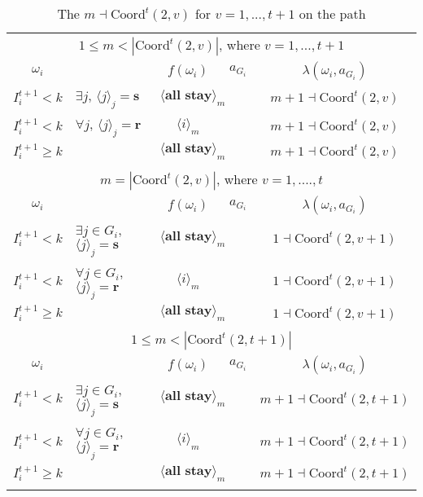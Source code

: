 \documentclass[12pt,letter]{article}
\newcommand{\Kappa}{\mathrm{Coord}}
\theoremstyle{definition}
\theoremstyle{remark}
\theoremstyle{claim}
\begin{document}
\begin{table}[!htbp]
\caption{The $m\dashv\Kappa^t(2,v)$ for $v=1,...,t+1$ on the path}
\label{table:eqm_path_kt2}
\begin{center}
\begin{tabular}{c l | c | c | c}
\multicolumn{5}{c}{$1\leq m < |\Kappa^t(2,v)|$, where $v=1,...,t+1$}\\
$\omega_i$ 	 & 	   &	$f(\omega_i)$  &	$a_{G_i}$ & $\lambda(\omega_i,a_{G_i})$ \\
\hline
\hline
$I^{t+1}_i< k$  	& 	$\exists j$, $\langle j \rangle_j=\textbf{s}$	& $\langle \textbf{all stay} \rangle_m$		&  	& $m+1\dashv \Kappa^t(2,v)$\\
$I^{t+1}_i< k$  	& 	$\forall j$, $\langle j \rangle_j=\textbf{r}$	& $\langle i \rangle_m$		&  	& $m+1\dashv \Kappa^t(2,v)$\\
$I^{t+1}_i\geq k$	 & 				& $\langle \textbf{all stay} \rangle_m$ 	& 		& $m+1\dashv \Kappa^t(2,v)$\\
\hline
\\
\multicolumn{5}{c}{$m= |\Kappa^t(2,v)|$, where $v=1,....,t$}\\
$\omega_i$ 	 & 	   &	$f(\omega_i)$  &	$a_{G_i}$ & $\lambda(\omega_i,a_{G_i})$ \\
\hline
\hline
$I^{t+1}_i< k$  	& 	$\exists j\in G_i$, $\langle j \rangle_j=\textbf{s}$	& $\langle \textbf{all stay} \rangle_m$		&  	& $1\dashv \Kappa^t(2,v+1)$\\
$I^{t+1}_i< k$  	& 	$\forall j\in G_i$, $\langle j \rangle_j=\textbf{r}$	& $\langle i \rangle_m$		&  	& $1\dashv \Kappa^t(2,v+1)$\\
$I^{t+1}_i\geq k$	 & 				& $\langle \textbf{all stay} \rangle_m$ 	& 		& $1\dashv \Kappa^t(2,v+1)$\\
\hline
\\
\multicolumn{5}{c}{$1\leq m < |\Kappa^t(2,t+1)|$}\\
$\omega_i$ 	 & 	   &	$f(\omega_i)$  &	$a_{G_i}$ & $\lambda(\omega_i,a_{G_i})$ \\
\hline
\hline
$I^{t+1}_i< k$  	& 	$\exists j\in G_i$, $\langle j \rangle_j=\textbf{s}$	& $\langle \textbf{all stay} \rangle_m$		&  	& $m+1\dashv \Kappa^t(2,t+1)$\\
$I^{t+1}_i< k$  	& 	$\forall j\in G_i$, $\langle j \rangle_j=\textbf{r}$	& $\langle i \rangle_m$		&  	& $m+1\dashv \Kappa^t(2,t+1)$\\
$I^{t+1}_i\geq k$	 & 				& $\langle \textbf{all stay} \rangle_m$ 	& 		& $m+1\dashv \Kappa^t(2,t+1)$\\
\hline
\\

\end{tabular}
\end{center}
\end{table}
\end{document}
